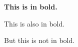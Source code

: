 \documentclass{article}
\begin{document}
{
\bf This is in bold.

This is also in bold.
}
But this is not in bold.
\end{document}
